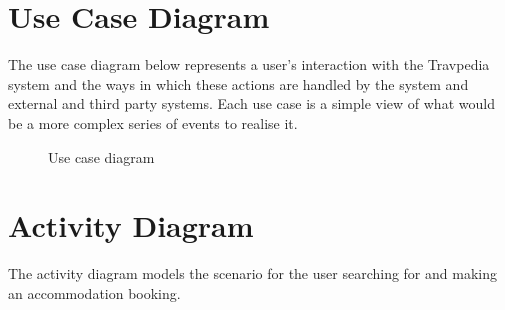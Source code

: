 \documentclass[a4paper]{article}
\begin{document}

\mbox{}
\thispagestyle{empty}

\tableofcontents
\clearpage
\setcounter{page}{1}


\clearpage

\clearpage

\section{Use Case Diagram}

The use case diagram below represents a user's interaction with the Travpedia
system and the ways in which these actions are handled by the system and
external and third party systems. Each use case is a simple view of what would
be a more complex series of events to realise it.

\begin{figure}[h!]
	\centering
	\caption{Use case diagram}
\end{figure}


\section{Activity Diagram}

The activity diagram models the scenario for the user searching for and making
an accommodation booking.
\end{document}
